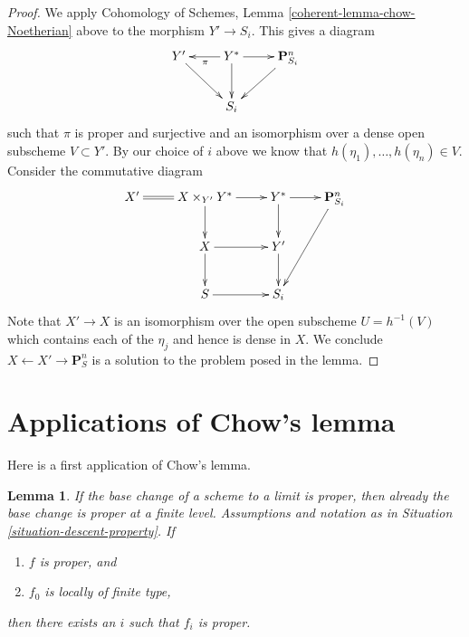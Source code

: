 \documentclass{stacks-project}
\newenvironment{slogan}{\comment}{\endcomment}
\theoremstyle{plain}
\newtheorem{lemma}[subsection]{Lemma}
\theoremstyle{definition}
\theoremstyle{remark}
\numberwithin{equation}{subsection}
\begin{document}
\begin{proof}
\medskip\noindent
We apply Cohomology of Schemes, Lemma
\ref{coherent-lemma-chow-Noetherian} above to the morphism
$Y' \to S_i$. This gives a diagram
$$
\xymatrix{
Y' \ar[rd] & Y^* \ar[d] \ar[l]^\pi \ar[r] & \mathbf{P}^n_{S_i} \ar[dl] \\
& S_i &
}
$$
such that $\pi$ is proper and surjective and an isomorphism over
a dense open subscheme $V \subset Y'$. By our choice of $i$ above
we know that $h(\eta_1), \ldots, h(\eta_n) \in V$. Consider
the commutative diagram
$$
\xymatrix{
X' \ar@{=}[r] &
X \times_{Y'} Y^* \ar[r] \ar[d] &
Y^* \ar[r] \ar[d] &
\mathbf{P}^n_{S_i} \ar[ddl] \\
& X \ar[r] \ar[d] & Y' \ar[d] & \\
& S \ar[r] & S_i &
}
$$
Note that $X' \to X$ is an isomorphism over the open subscheme
$U = h^{-1}(V)$ which contains each of the $\eta_j$ and hence is
dense in $X$. We conclude $X \leftarrow X' \rightarrow \mathbf{P}^n_S$
is a solution to the problem posed in the lemma.
\end{proof}













\section{Applications of Chow's lemma}
\label{section-apply-chow}

\noindent
Here is a first application of Chow's lemma.

\begin{lemma}
\label{lemma-eventually-proper}
\begin{slogan}
If the base change of a scheme to a limit is proper, then
already the base change is proper at a finite level.
\end{slogan}
Assumptions and notation as in Situation \ref{situation-descent-property}.
If
\begin{enumerate}
\item $f$ is proper, and
\item $f_0$ is locally of finite type,
\end{enumerate}
then there exists an $i$ such that $f_i$ is proper.
\end{lemma}
\end{document}
